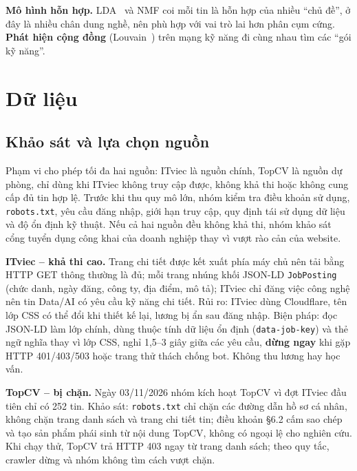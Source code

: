 \documentclass[12pt]{article}
\newcommand{\code}[1]{\texttt{#1}}
\begin{document}
\textbf{Mô hình hỗn hợp.} LDA~\cite{blei2003lda} và NMF coi mỗi tin là hỗn hợp của nhiều ``chủ đề'', ở đây là nhiều chân dung nghề, nên phù hợp với vai trò lai hơn phân cụm cứng. \textbf{Phát hiện cộng đồng} (Louvain~\cite{blondel2008louvain}) trên mạng kỹ năng đi cùng nhau tìm các ``gói kỹ năng''.

\newpage
\section{Dữ liệu}
\subsection{Khảo sát và lựa chọn nguồn}
\label{sec:sources}

Phạm vi cho phép tối đa hai nguồn: ITviec là nguồn chính, TopCV là nguồn dự phòng, chỉ dùng khi ITviec không truy cập được, không khả thi hoặc không cung cấp đủ tin hợp lệ. Trước khi thu quy mô lớn, nhóm kiểm tra điều khoản sử dụng, \code{robots.txt}, yêu cầu đăng nhập, giới hạn truy cập, quy định tái sử dụng dữ liệu và độ ổn định kỹ thuật. Nếu cả hai nguồn đều không khả thi, nhóm khảo sát cổng tuyển dụng công khai của doanh nghiệp thay vì vượt rào cản của website.

\textbf{ITviec -- khả thi cao.} Trang chi tiết được kết xuất phía máy chủ nên tải bằng HTTP GET thông thường là đủ; mỗi trang nhúng khối JSON-LD \code{JobPosting} (chức danh, ngày đăng, công ty, địa điểm, mô tả); ITviec chỉ đăng việc công nghệ nên tin Data/AI có yêu cầu kỹ năng chi tiết. Rủi ro: ITviec dùng Cloudflare, tên lớp CSS có thể đổi khi thiết kế lại, lương bị ẩn sau đăng nhập. Biện pháp: đọc JSON-LD làm lớp chính, dùng thuộc tính dữ liệu ổn định (\code{data-job-key}) và thẻ ngữ nghĩa thay vì lớp CSS, nghỉ 1,5--3 giây giữa các yêu cầu, \textbf{dừng ngay} khi gặp HTTP 401/403/503 hoặc trang thử thách chống bot. Không thu lương hay học vấn.

\textbf{TopCV -- bị chặn.} Ngày 03/11/2026 nhóm kích hoạt TopCV vì đợt ITviec đầu tiên chỉ có 252 tin. Khảo sát: \code{robots.txt} chỉ chặn các đường dẫn hồ sơ cá nhân, không chặn trang danh sách và trang chi tiết tin; điều khoản §6.2 cấm sao chép và tạo sản phẩm phái sinh từ nội dung TopCV, không có ngoại lệ cho nghiên cứu. Khi chạy thử, TopCV trả HTTP 403 ngay từ trang danh sách; theo quy tắc, crawler dừng và nhóm không tìm cách vượt chặn.
\end{document}

